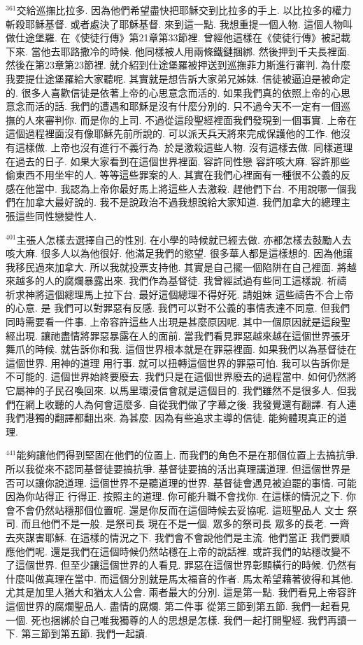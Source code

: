 \documentclass{book}
\begin{document}
$^{361}$交給巡撫比拉多.
因為他們希望盡快把耶穌交到比拉多的手上.
以比拉多的權力斬殺耶穌基督.
或者處決了耶穌基督.
來到這一點.
我想重提一個人物.
這個人物叫做仕途堡羅.
在《使徒行傳》第21章第33節裡.
曾經他這樣在《使徒行傳》被記載下來.
當他去耶路撒冷的時候.
他同樣被人用兩條鐵鏈捆綁.
然後押到千夫長裡面.
然後在第23章第23節裡.
就介紹到仕途堡羅被押送到巡撫菲力斯進行審判.
為什麼我要提仕途堡羅給大家聽呢.
其實就是想告訴大家弟兄姊妹.
信徒被逼迫是被命定的.
很多人喜歡信徒是依著上帝的心思意念而活的.
如果我們真的依照上帝的心思意念而活的話.
我們的遭遇和耶穌是沒有什麼分別的.
只不過今天不一定有一個巡撫的人來審判你.
而是你的上司.
不過從這段聖經裡面我們發現到一個事實.
上帝在這個過程裡面沒有像耶穌先前所說的.
可以派天兵天將來完成保護他的工作.
他沒有這樣做.
上帝也沒有進行不義行為.
於是激殺這些人物.
沒有這樣去做.
同樣道理在過去的日子.
如果大家看到在這個世界裡面.
容許同性戀 容許咳大麻.
容許那些偷東西不用坐牢的人.
等等這些罪案的人.
其實在我們心裡面有一種很不公義的反感在他當中.
我認為上帝你最好馬上將這些人去激殺.
趕他們下台.
不用說哪一個我們在加拿大最好說的.
我不是說政治不過我想說給大家知道.
我們加拿大的總理主張這些同性戀變性人.

$^{401}$主張人怎樣去選擇自己的性別.
在小學的時候就已經去做.
亦都怎樣去鼓勵人去咳大麻.
很多人以為他很好.
他滿足我們的慾望.
很多華人都是這樣想的.
因為他讓我移民過來加拿大.
所以我就投票支持他.
其實是自己擺一個陷阱在自己裡面.
將越來越多的人的腐爛暴露出來.
我們作為基督徒.
我曾經試過有些同工這樣說.
祈禱 祈求神將這個總理馬上拉下台.
最好這個總理不得好死.
請姐妹 這些禱告不合上帝的心意.
是 我們可以對罪惡有反感.
我們可以對不公義的事情表達不同意.
但我們同時需要看一件事.
上帝容許這些人出現是甚麼原因呢.
其中一個原因就是這段聖經出現.
讓祂盡情將罪惡暴露在人的面前.
當我們看見罪惡越來越在這個世界張牙舞爪的時候.
就告訴你和我.
這個世界根本就是在罪惡裡面.
如果我們以為基督徒在這個世界.
用神的道理 用行事.
就可以扭轉這個世界的罪惡可怕.
我可以告訴你是不可能的.
這個世界始終要廢去.
我們只是在這個世界廢去的過程當中.
如何仍然將它屬神的子民召喚回來.
以馬里環浸信會就是這個目的.
我們雖然不是很多人.
但我們在網上收聽的人為何會這麼多.
自從我們做了字幕之後.
我發覺還有翻譯.
有人連我們港獨的翻譯都翻出來.
為甚麼.
因為有些追求主導的信徒.
能夠體現真正的道理.

$^{441}$能夠讓他們得到堅固在他們的位置上.
而我們的角色不是在那個位置上去搞抗爭.
所以我從來不認同基督徒要搞抗爭.
基督徒要搞的活出真理講道理.
但這個世界是否可以讓你說道理.
這個世界不是聽道理的世界.
基督徒會遇見被迫罷的事情.
可能因為你站得正 行得正.
按照主的道理.
你可能升職不會找你.
在這樣的情況之下.
你會不會仍然站穩那個位置呢.
還是你反而在這個時候去妥協呢.
這班聖品人 文士 祭司.
而且他們不是一般.
是祭司長 現在不是一個.
眾多的祭司長 眾多的長老.
一齊去夾謀害耶穌.
在這樣的情況之下.
我們會不會說他們是主流.
他們當正 我們要順應他們呢.
還是我們在這個時候仍然站穩在上帝的說話裡.
或許我們的站穩改變不了這個世界.
但至少讓這個世界的人看見.
罪惡在這個世界彰顯橫行的時候.
仍然有什麼叫做真理在當中.
而這個分別就是馬太福音的作者.
馬太希望藉著彼得和其他.
尤其是加里人猶大和猶太人公會.
兩者最大的分別.
這是第一點.
我們看見上帝容許這個世界的腐爛聖品人.
盡情的腐爛.
第二件事 從第三節到第五節.
我們一起看見一個.
死也捆綁於自己唯我獨尊的人的思想是怎樣.
我們一起打開聖經.
我們再讀一下.
第三節到第五節.
我們一起讀.
\end{document}

